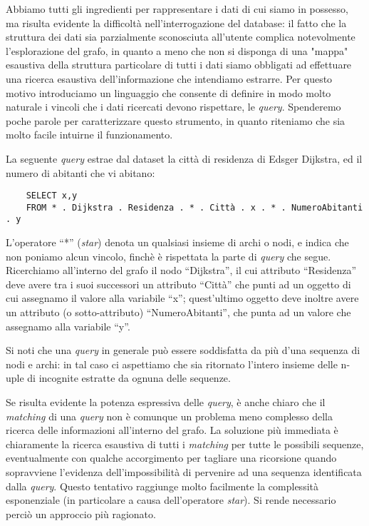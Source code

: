 Abbiamo tutti gli ingredienti per rappresentare i dati di cui siamo in possesso, ma risulta evidente la difficoltà nell'interrogazione del database: il fatto che la struttura dei dati sia parzialmente sconosciuta all'utente complica notevolmente l'esplorazione del grafo, in quanto a meno che non si disponga di una "mappa" esaustiva della struttura particolare di tutti i dati siamo obbligati ad effettuare una ricerca esaustiva dell'informazione che intendiamo estrarre. Per questo motivo introduciamo un linguaggio che consente di definire in modo molto naturale i vincoli che i dati ricercati devono rispettare, le \emph{query}. Spenderemo poche parole per caratterizzare questo strumento, in quanto riteniamo che sia molto facile intuirne il funzionamento.
\begin{example}
    La seguente \emph{query} estrae dal dataset la città di residenza di Edsger Dijkstra, ed il numero di abitanti che vi abitano:
    \begin{verbatim}
    SELECT x,y
    FROM * . Dijkstra . Residenza . * . Città . x . * . NumeroAbitanti . y
    \end{verbatim}
    L'operatore ``*'' (\emph{star}) denota un qualsiasi insieme di archi o nodi, e indica che non poniamo alcun vincolo, finchè è rispettata la parte di \emph{query} che segue. Ricerchiamo all'interno del grafo il nodo ``Dijkstra'', il cui attributo ``Residenza'' deve avere tra i suoi successori un attributo ``Città'' che punti ad un oggetto di cui assegnamo il valore alla variabile ``x''; quest'ultimo oggetto deve inoltre avere un attributo (o sotto-attributo) ``NumeroAbitanti'', che punta ad un valore che assegnamo alla variabile ``y''.
\end{example}
Si noti che una \emph{query} in generale può essere soddisfatta da più d'una sequenza di nodi e archi: in tal caso ci aspettiamo che sia ritornato l'intero insieme delle n-uple di incognite estratte da ognuna delle sequenze.

Se risulta evidente la potenza espressiva delle \emph{query}, è anche chiaro che il \emph{matching} di una \emph{query} non è comunque un problema meno complesso della ricerca delle informazioni all'interno del grafo. La soluzione più immediata è chiaramente la ricerca esaustiva di tutti i \emph{matching} per tutte le possibili sequenze, eventualmente con qualche accorgimento per tagliare una ricorsione quando sopravviene l'evidenza dell'impossibilità di pervenire ad una sequenza identificata dalla \emph{query}. Questo tentativo raggiunge molto facilmente la complessità esponenziale (in particolare a causa dell'operatore \emph{star}). Si rende necessario perciò un approccio più ragionato.

